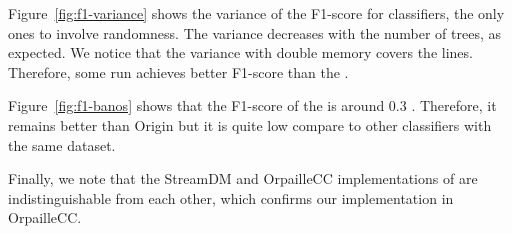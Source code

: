Figure~\ref{fig:f1-variance} shows the variance of the F1-score for
\mondrianforest classifiers, the only ones to involve randomness. The
variance decreases with the number of trees, as expected. We notice that
the \mondrianforest variance with double memory covers the \naivebayes
lines. Therefore, some \mondrianforest run achieves better F1-score than
the \naivebayes {}.

Figure~\ref{fig:f1-banos} shows that the F1-score of the \FNN
is around 0.3 . Therefore, it remains better than \mcnn Origin but it is quite
low compare to other classifiers with the same dataset. 

Finally, we note that the StreamDM and OrpailleCC implementations of
\naivebayes are indistinguishable from each other, which confirms our
implementation in OrpailleCC.

